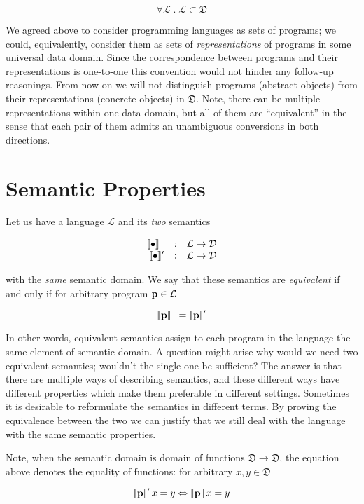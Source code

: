 \[
\forall \mathcal{L}\; .\; \mathcal{L}\subset\mathfrak{D}
\]

We agreed above to consider programming languages as sets of programs; we could, equivalently, consider them as sets of \emph{representations} of
programs in some universal data domain. Since the correspondence between programs and their representations is one-to-one this convention would
not hinder any follow-up reasonings. From now on we will not distinguish programs (abstract objects) from their representations (concrete objects)
in $\mathfrak{D}$. Note, there can be multiple representations within one data domain, but all of them are ``equivalent'' in the sense that
each pair of them admits an unambiguous conversions in both directions.

\section{Semantic Properties}

Let us have a language $\mathcal{L}$ and its \emph{two} semantics

\[
\begin{array}{rcl}
    \sembr{\bullet}^\ph & : & \mathcal{L} \to \mathcal{D}\\
  \sembr{\bullet}^\prime & : & \mathcal{L} \to \mathcal{D}
\end{array}
\]

with the \emph{same} semantic domain. We say that these semantics are \emph{equivalent} if and only if for arbitrary program $\mathbf{p}\in\mathcal{L}$

\[
\sembr{\primi{p}}^\ph=\sembr{\primi{p}}^\prime
\]

In other words, equivalent semantics assign to each program in the language the same element of semantic domain. A question might arise why would we
need two equivalent semantics; wouldn't the single one be sufficient? The answer is that there are multiple ways of
describing semantics, and these different ways have different properties which make them preferable in different settings. Sometimes it is desirable to
reformulate the semantics in different terms. By proving the equivalence between the two we can justify that we still deal with the language with the same
semantic properties.

Note, when the semantic domain is domain of functions $\mathfrak{D}\to\mathfrak{D}$, the equation above denotes the equality of functions: for
arbitrary $x, y\in\mathfrak{D}$

\[
\llbracket{\mathbf{p}}\rrbracket^\prime\,x=y \Leftrightarrow \llbracket{\mathbf{p}}\rrbracket\,x=y
\]

